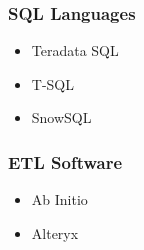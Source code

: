 \documentclass[letterpaper]{article}
\begin{document}
\begin{fullwidth}[width=\linewidth+2cm]
\begin{minipage}[t]{0.25\linewidth}
\begin{tcolorbox}[breakable, capture=minipage, title=Skills]
  \subsubsection*{SQL Languages}
  \begin{itemize}
  \item Teradata SQL
  \item T-SQL %
  \item SnowSQL
  \end{itemize}
  
    \subsubsection*{ETL Software}%
    \begin{itemize} %
    \item Ab Initio
      \item Alteryx
    \end{itemize}

\end{tcolorbox}
\end{minipage}
\end{fullwidth}
\end{document}
